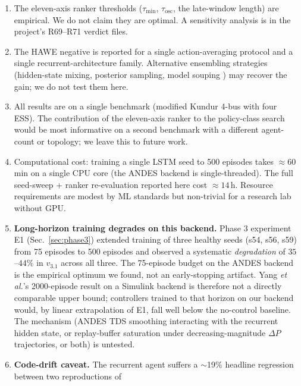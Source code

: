 \documentclass[journal,onecolumn,11pt]{IEEEtran}
\begin{document}
\begin{enumerate}
  \item The eleven-axis ranker thresholds ($\tau_{\text{min}}$,
        $\tau_{\text{osc}}$, the late-window length) are
        empirical. We do not claim they are optimal. A sensitivity
        analysis is in the project's R69--R71 verdict files.
  \item The HAWE negative is reported for a single
        action-averaging protocol and a single recurrent-architecture
        family. Alternative ensembling strategies (hidden-state
        mixing, posterior sampling, model souping
        \cite{kurutach2018modelens,wortsman2022modelsoup}) may
        recover the gain; we do not test them here.
  \item All results are on a single benchmark (modified Kundur 4-bus
        with four ESS). The contribution of the eleven-axis ranker to
        the policy-class search would be most informative on a
        second benchmark with a different agent-count or topology;
        we leave this to future work.
  \item Computational cost: training a single LSTM seed to 500
        episodes takes $\approx 60$\,min on a single CPU core
        (the ANDES backend is single-threaded). The full
        seed-sweep + ranker re-evaluation reported here cost
        $\approx 14$\,h. Resource requirements are modest by ML
        standards but non-trivial for a research lab without GPU.
  \item \textbf{Long-horizon training degrades on this backend.}
        Phase 3 experiment E1 (Sec.~\ref{sec:phase3}) extended
        training of three healthy seeds (s54, s56, s59) from 75
        episodes to 500 episodes and observed a systematic
        \emph{degradation} of $35$--$44\%$ in $v_{3.1}$ across all
        three. The 75-episode budget on the ANDES backend is the
        empirical optimum we found, not an early-stopping
        artifact. Yang \emph{et al.}'s 2000-episode result on a
        Simulink backend is therefore not a directly comparable
        upper bound; controllers trained to that horizon on our
        backend would, by linear extrapolation of E1, fall well
        below the no-control baseline. The mechanism (ANDES TDS
        smoothing interacting with the recurrent hidden state,
        or replay-buffer saturation under decreasing-magnitude
        $\Delta P$ trajectories, or both) is untested.
  \item \textbf{Code-drift caveat.} The recurrent agent suffers a
        $\sim$19\% headline regression between two reproductions of

\end{enumerate}
\end{document}
